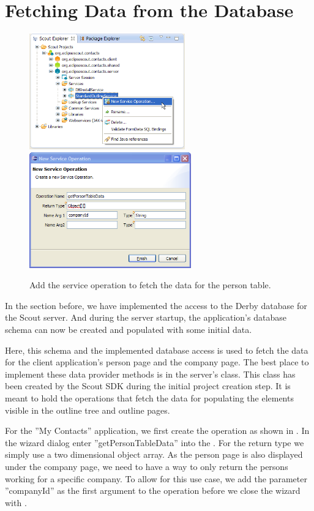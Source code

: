 \documentclass[a4paper,10pt,twoside]{book}
\begin{document}
\section{Fetching Data from the Database}

\begin{figure}
\includegraphics[height=5cm]{new_service_persontabledata_contextmenu.png} \hspace{5mm}
\includegraphics[height=5cm]{new_service_persontabledata.png}
\caption{Add the service operation to fetch the data for the person table. }
\end{figure}

In the section before, we have implemented the access to the Derby database for the Scout server. 
And during the server startup, the application's database schema can now be created and populated with some initial data. 

Here, this schema and the implemented database access is used to fetch the data for the client application's person page and the company page. 
The best place to implement these data provider methods is in the server's  class. 
This class has been created by the Scout SDK during the initial project creation step.
It is meant to hold the operations that fetch the data for populating the elements visible in the outline tree and outline pages. 

For the ''My Contacts'' application, we first create the  operation as shown in . 
In the wizard dialog enter ''getPersonTableData'' into the . 
For the return type we simply use a two dimensional object array. 
As the person page is also displayed under the company page, we need to have a way to only return the persons working for a specific company. 
To allow for this use case, we add the parameter ''companyId'' as the first argument to the  operation before we close the wizard with . 
\end{document}
